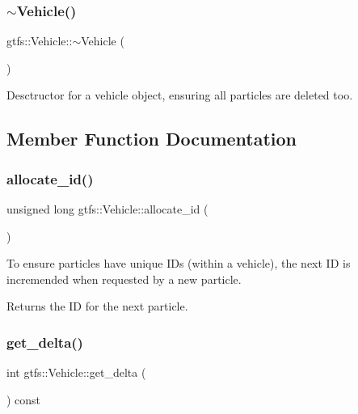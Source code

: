 \subsubsection{\texorpdfstring{$\sim$\+Vehicle()}{~Vehicle()}}
{\footnotesize\ttfamily gtfs\+::\+Vehicle\+::$\sim$\+Vehicle (\begin{DoxyParamCaption}{ }\end{DoxyParamCaption})}

Desctructor for a vehicle object, ensuring all particles are deleted too. 

\subsection{Member Function Documentation}
\mbox{\label{classgtfs_1_1Vehicle_aa9087e973a9821f384ec47f51bdcedc7}} 
\subsubsection{\texorpdfstring{allocate\+\_\+id()}{allocate\_id()}}
{\footnotesize\ttfamily unsigned long gtfs\+::\+Vehicle\+::allocate\+\_\+id (\begin{DoxyParamCaption}{ }\end{DoxyParamCaption})}

To ensure particles have unique ID\textquotesingle{}s (within a vehicle), the next ID is incremended when requested by a new particle.

\begin{DoxyReturn}{Returns}
the ID for the next particle. 
\end{DoxyReturn}
\mbox{\label{classgtfs_1_1Vehicle_a23c0a191559e4066423d5f3cbfb70b46}} 
\subsubsection{\texorpdfstring{get\+\_\+delta()}{get\_delta()}}
{\footnotesize\ttfamily int gtfs\+::\+Vehicle\+::get\+\_\+delta (\begin{DoxyParamCaption}{ }\end{DoxyParamCaption}) const}

